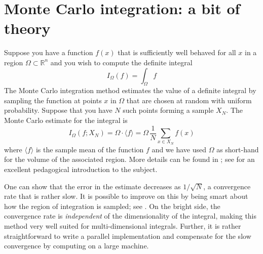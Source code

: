 %


\section{Monte Carlo integration: a bit of theory}
\label{sec:montecarlo}

Suppose you have a function $f(x)$ that is sufficiently well behaved for
all $x$ in a region $\Omega \subset \mathbb{R}^{n}$ and you wish to compute the
definite integral
%
\begin{equation}
  I_{\Omega} (f)
  =
  \int_{\Omega} f
\label{eq:integral}
\end{equation}
%
The Monte Carlo integration method estimates the value of a definite integral by sampling
the function at points $x$ in $\Omega$ that are chosen at random with uniform
probability. Suppose that you have $N$ such points forming a sample $X_{N}$. The Monte
Carlo estimate for the integral is
%
\begin{equation}
  I_{\Omega} (f; X_{N})
  =
  \Omega \cdot \langle f \rangle
  =
  \Omega \, \frac{1}{N} \sum_{x \in X_{N}} f(x)
\label{eq:mc-estimate}
\end{equation}
%
where $\langle f \rangle$ is the sample mean of the function $f$ and we have used $\Omega$
as short-hand for the volume of the associated region. More details can be found in
\citep{hammersley,ueberhuber}; see \cite{weinzierl} for an excellent pedagogical
introduction to the subject.

One can show that the error in the estimate decreases as $1/\sqrt{N}$, a convergence rate that
is rather slow. It is possible to improve on this by being smart about how the region of
integration is sampled; see \cite{lepage-78,lepage-80,press}. On the bright side, the
convergence rate is {\em independent} of the dimensionality of the integral, making this method
very well suited for multi-dimensional integrals. Further, it is rather straightforward to
write a parallel implementation and compensate for the slow convergence by computing on a large
machine.

